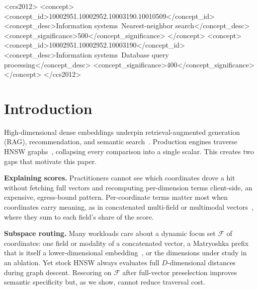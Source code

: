 \documentclass[sigconf,review,balance=false]{acmart}
\begin{document}
\begin{CCSXML}
<ccs2012>
   <concept>
       <concept_id>10002951.10002952.10003190.10010509</concept_id>
       <concept_desc>Information systems~Nearest-neighbor search</concept_desc>
       <concept_significance>500</concept_significance>
   </concept>
   <concept>
       <concept_id>10002951.10002952.10003190</concept_id>
       <concept_desc>Information systems~Database query processing</concept_desc>
       <concept_significance>400</concept_significance>
   </concept>
</ccs2012>
\end{CCSXML}



\maketitle

\section{Introduction}
\label{sec:intro}

High-dimensional dense embeddings underpin retrieval-augmented generation
(RAG), recommendation, and semantic search~\cite{lewis2020rag,qdrant2024,wang2021milvus}.
Production engines traverse HNSW graphs~\cite{malkov2018hnsw}, collapsing every
comparison into a single scalar. This creates two gaps that motivate this paper.

\textbf{Explaining scores.} Practitioners cannot see which coordinates drove a
hit without fetching full vectors and recomputing per-dimension terms
client-side, an expensive, egress-bound pattern. Per-coordinate terms matter
most when coordinates carry meaning, as in concatenated multi-field or
multimodal vectors~\cite{wang2024must}, where they sum to each field's share
of the score.

\textbf{Subspace routing.} Many workloads care about a dynamic focus set
$\mathcal{F}$ of coordinates: one field or modality of a concatenated
vector, a Matryoshka prefix that is itself a lower-dimensional
embedding~\cite{kusupati2022matryoshka}, or the dimensions under study in an
ablation. Yet stock HNSW always evaluates full $D$-dimensional distances
during graph descent.
Rescoring on $\mathcal{F}$ after full-vector preselection improves semantic
specificity but, as we show, cannot reduce traversal cost.
\end{document}
